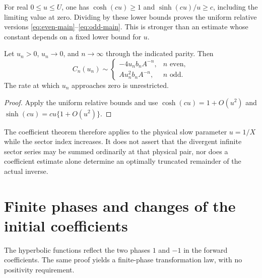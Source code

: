 For real $0\le u\le U$, one has $\cosh(cu)\ge1$ and
$\sinh(cu)/u\ge c$, including the limiting value at zero. Dividing by
these lower bounds proves the uniform relative versions
\eqref{eq:even-main}--\eqref{eq:odd-main}. This is stronger than an estimate
whose constant depends on a fixed lower bound for $u$.

\begin{corollary}\label{cor:moving-u}
Let $u_n>0$, $u_n\to0$, and $n\to\infty$ through the indicated parity.
Then
\begin{equation}\label{eq:small-u-late}
 C_n(u_n)\sim
 \begin{cases}
 -4u_n b_nA^{-n},&n\text{ even},\\
 A u_n^2 b_nA^{-n},&n\text{ odd}.
 \end{cases}
\end{equation}
The rate at which $u_n$ approaches zero is unrestricted.
\end{corollary}
\begin{proof}
Apply the uniform relative bounds and use
$\cosh(cu)=1+O(u^2)$ and $\sinh(cu)=cu\{1+O(u^2)\}$.
\end{proof}

The coefficient theorem therefore applies to the physical slow parameter
$u=1/X$ while the sector index increases. It does not assert that the
divergent infinite sector series may be summed ordinarily at that physical
pair, nor does a coefficient estimate alone determine an optimally
truncated remainder of the actual inverse.

\section{Finite phases and changes of the initial coefficients}\label{sec:phases}

The hyperbolic functions reflect the two phases $1$ and $-1$ in the
forward coefficients. The same proof yields a finite-phase transformation
law, with no positivity requirement.

